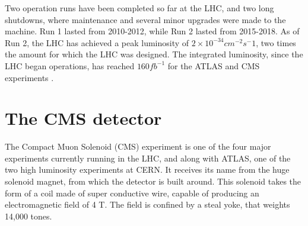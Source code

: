 Two operation runs have been completed so far at the LHC, and two long shutdowns, where maintenance and several minor upgrades were made to the machine.  Run 1 lasted from 2010-2012, while Run 2 lasted from  2015-2018. As of Run 2, the LHC has achieved a peak luminosity of $2\times 10^{-34} cm^{-2}s^-1$, two times the amount for which the LHC was designed. The integrated luminosity, since the LHC began operations, has reached $160 fb^{-1}$ for the ATLAS and CMS experiments \cite{lumi2180}.
\section{The CMS detector }
The Compact Muon Solenoid (CMS) experiment is one of the four major experiments currently running in the LHC, and along with ATLAS, one of the two high luminosity experiments at CERN. It receives its name from the huge solenoid magnet, from which the detector is built around. This solenoid takes the form of a coil made of super conductive wire, capable of producing an electromagnetic field of 4 T. The field is confined by a steal yoke, that weights 14,000 tones.

